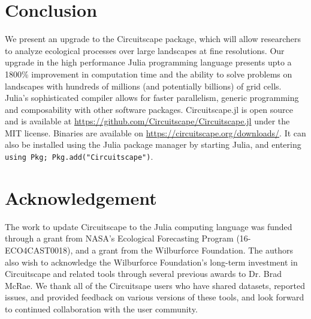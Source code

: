 \documentclass{juliacon}
\begin{document}

\section{Conclusion}
We present an upgrade to the Circuitscape package, which will allow researchers to analyze ecological processes over large landscapes at fine resolutions. Our upgrade in the high performance Julia programming language presents upto a 1800\% improvement in computation time and the ability to solve problems on landscapes with hundreds of millions (and potentially billions) of grid cells. Julia’s sophisticated compiler allows for faster parallelism, generic programming and composability with other software packages. Circuitscape.jl is open source and is available at \url{https://github.com/Circuitscape/Circuitscape.jl} under the MIT license. Binaries are available on \url{https://circuitscape.org/downloads/}. It can also be installed using the Julia package manager by starting Julia, and entering \texttt{using Pkg; Pkg.add("Circuitscape")}. 

\section{Acknowledgement}
The work to update Circuitscape to the Julia computing language was funded through a grant from NASA’s Ecological Forecasting Program (16-ECO4CAST0018), and a grant from the Wilburforce Foundation.  The authors also wish to acknowledge the Wilburforce Foundation’s long-term investment in Circuitscape and related tools through several previous awards to Dr. Brad McRae.  We thank all of the Circuitsape users who have shared datasets, reported issues, and provided feedback on various versions of these tools, and look forward to continued collaboration with the user community. 


\end{document}
